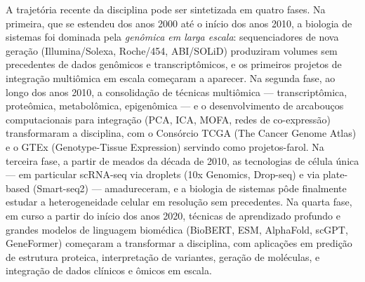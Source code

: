 
A trajetória recente da disciplina pode ser sintetizada em quatro fases. Na primeira, que se estendeu dos anos 2000 até o início dos anos 2010, a biologia de sistemas foi dominada pela \emph{genômica em larga escala}: sequenciadores de nova geração (Illumina/Solexa, Roche/454, ABI/SOLiD) produziram volumes sem precedentes de dados genômicos e transcriptômicos, e os primeiros projetos de integração multiômica em escala começaram a aparecer. Na segunda fase, ao longo dos anos 2010, a consolidação de técnicas multiômica --- transcriptômica, proteômica, metabolômica, epigenômica --- e o desenvolvimento de arcabouços computacionais para integração (PCA, ICA, MOFA, redes de co-expressão) transformaram a disciplina, com o Consórcio TCGA (The Cancer Genome Atlas) e o GTEx (Genotype-Tissue Expression) servindo como projetos-farol. Na terceira fase, a partir de meados da década de 2010, as tecnologias de célula única --- em particular scRNA-seq via droplets (10x Genomics, Drop-seq) e via plate-based (Smart-seq2) --- amadureceram, e a biologia de sistemas pôde finalmente estudar a heterogeneidade celular em resolução sem precedentes. Na quarta fase, em curso a partir do início dos anos 2020, técnicas de aprendizado profundo e grandes modelos de linguagem biomédica (BioBERT, ESM, AlphaFold, scGPT, GeneFormer) começaram a transformar a disciplina, com aplicações em predição de estrutura proteica, interpretação de variantes, geração de moléculas, e integração de dados clínicos e ômicos em escala.

